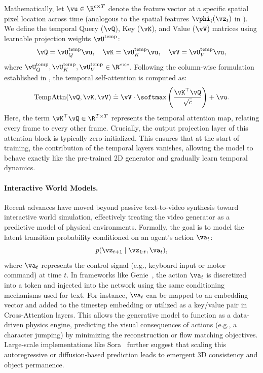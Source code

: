\documentclass[../../book-main.tex]{subfiles}
\begin{document}
Mathematically, let \(\vu \in \R^{c \times T}\) denote the feature vector at a specific spatial pixel location across time (analogous to the spatial features \(\vphi_{i}(\vz_{t})\) in ).
We define the temporal Query (\(\vQ\)), Key (\(\vK\)), and Value (\(\vV\)) matrices using learnable projection weights \(\vU^{\text{temp}}\):
\begin{equation}
    \vQ = \vU^{\text{temp}}_{Q} \vu, \quad \vK = \vU^{\text{temp}}_{K} \vu, \quad \vV = \vU^{\text{temp}}_{V} \vu ,
\end{equation}
where \(\vU^{\text{temp}}_{Q}, \vU^{\text{temp}}_{K}, \vU^{\text{temp}}_{V} \in \R^{c \times c}\).
Following the column-wise formulation established in , the temporal self-attention is computed as:
\begin{equation}
    \text{TempAttn}(\vQ, \vK, \vV) \doteq \vV \cdot \softmax\left( \frac{\vK^\top \vQ}{\sqrt{c}} \right) + \vu .
\end{equation}
Here, the term \(\vK^\top \vQ \in \R^{T \times T}\) represents the temporal attention map, relating every frame to every other frame.
Crucially, the output projection layer of this attention block is typically zero-initialized.
This ensures that at the start of training, the contribution of the temporal layers vanishes, allowing the model to behave exactly like the pre-trained 2D generator and gradually learn temporal dynamics.

\paragraph{Interactive World Models.}
Recent advances have moved beyond passive text-to-video synthesis toward interactive world simulation, effectively treating the video generator as a predictive model of physical environments.
Formally, the goal is to model the latent transition probability conditioned on an agent's action \(\va_{t}\):
\begin{equation}
    p(\vz_{t+1} \mid \vz_{1:t}, \va_{t}) ,
\end{equation}
where \(\va_{t}\) represents the control signal (e.g., keyboard input or motor command) at time \(t\).
In frameworks like Genie~\citep{bruce2024genie}, the action \(\va_{t}\) is discretized into a token and injected into the network using the same conditioning mechanisms used for text.
For instance, \(\va_{t}\) can be mapped to an embedding vector and added to the timestep embedding or utilized as a key/value pair in Cross-Attention layers.
This allows the generative model to function as a data-driven physics engine, predicting the visual consequences of actions (e.g., a character jumping) by minimizing the reconstruction or flow matching objectives.
Large-scale implementations like Sora~\citep{openai2024sora} further suggest that scaling this autoregressive or diffusion-based prediction leads to emergent 3D consistency and object permanence.
\end{document}
